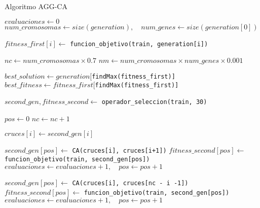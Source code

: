 \begin{algorithm}[H]
	\caption{Algoritmo AGG-CA}
	\fontsize{8}{9pt}\selectfont
	\label{alg:aggca}
	\begin{algorithmic}[1]
		\State $evaluaciones \gets 0$
		\State $num\_cromosomas \gets size(generation), \quad num\_genes \gets size(generation[0])$
		
		
		\State$fitness\_first[i] \gets$ \texttt{funcion\_objetivo(train, generation[i])}
		\EndFor
		
		
		\State $nc \gets num\_cromosomas \times 0.7$
		\State $nm \gets num\_cromosomas \times num\_genes \times 0.001$
		
		\vspace{0.2cm}	
		
		
		\State $best\_solution \gets generation[$\texttt{findMax(fitness\_first)]}
		\State $best\_fitness \gets fitness\_first[$\texttt{findMax(fitness\_first)]}
		
		\vspace{0.2cm}	
		
		\State $second\_gen, fitness\_second \gets$ \texttt{operador\_seleccion(train, 30)}
		
		\vspace{0.2cm}	
		
		\State $pos \gets 0$
		\State $nc \gets nc + 1$
		\EndIf
		
		\State $cruces[i] \gets second\_gen[i]$
		\EndFor
		\vspace{0.2cm}	
		
		\State $second\_gen[pos] \gets$ \texttt{CA(cruces[i], cruces[i+1])}
		\State  $fitness\_second[pos] \gets$ \texttt{funcion\_objetivo(train, second\_gen[pos])}
		\State $evaluaciones \gets evaluaciones + 1, \quad pos \gets pos + 1$
		\EndFor
		
		\State $second\_gen[pos] \gets$ \texttt{CA(cruces[i], cruces[nc - i -1])}
		\State  $fitness\_second[pos] \gets$ \texttt{funcion\_objetivo(train, second\_gen[pos])}
		\State $evaluaciones \gets evaluaciones + 1, \quad pos \gets pos + 1$
		\EndFor
		

\end{algorithmic}
\end{algorithm}
